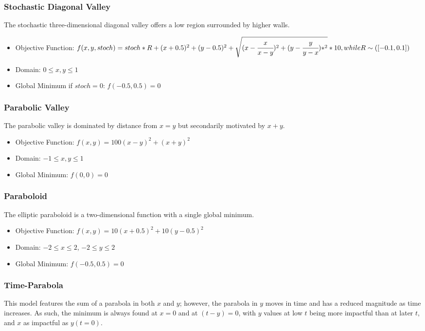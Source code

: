 \subsubsection{Stochastic Diagonal Valley}
The stochastic three-dimensional diagonal valley offers a low region surrounded by higher walls.

\begin{itemize}
  \item Objective Function: $f(x,y,stoch) = stoch * R + (x+0.5)^2 + (y-0.5)^2 + \sqrt{(x - \cfrac{x}{x-y})^2 + (y - \cfrac{y}{y-x})*^2} * 10, while R\sim ([-0.1,0.1])$
  \item Domain: $0 \leq x,y \leq 1$
  \item Global Minimum if $stoch =0$: $f(-0.5,0.5)=0$
\end{itemize}

\subsubsection{Parabolic Valley}
The parabolic valley is dominated by distance from $x=y$ but secondarily motivated by $x+y$.

\begin{itemize}
  \item Objective Function: $f(x,y) = 100 (x - y)^2 + (x + y)^2$
  \item Domain: $-1 \leq x,y \leq 1$
  \item Global Minimum: $f(0,0)=0$
\end{itemize}

\subsubsection{Paraboloid}
The elliptic paraboloid is a two-dimensional function with a single global minimum.

\begin{itemize}
  \item Objective Function: $f(x,y) = 10(x+0.5)^2 + 10(y-0.5)^2 $
  \item Domain: $-2 \leq x \leq 2$, $-2 \leq y \leq 2$
  \item Global Minimum: $f(-0.5,0.5) = 0$
\end{itemize}

\subsubsection{Time-Parabola}
This model features the sum of a parabola in both $x$ and $y$; however, the parabola in $y$ moves in time and
has a reduced magnitude as time increases. As such, the minimum is always found at $x=0$ and at $(t-y)=0$, with
$y$ values at low $t$ being more impactful than at later $t$, and $x$ as impactful as $y(t=0)$.

